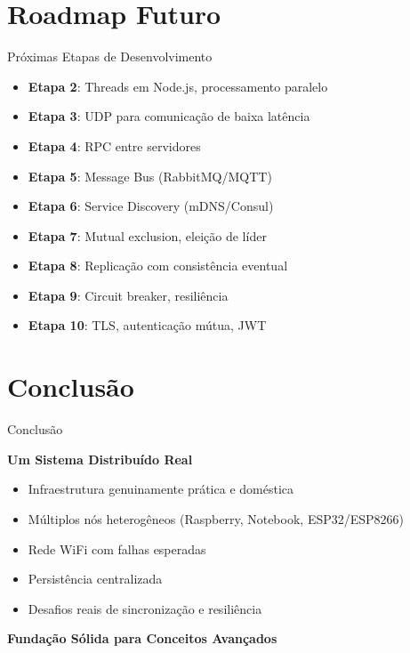 \documentclass[12pt,aspectratio=16:9]{beamer}
\begin{document}
\section{Roadmap Futuro}

\begin{frame}{Próximas Etapas de Desenvolvimento}
    \begin{itemize}[<+->]
        \item \textbf{Etapa 2}: Threads em Node.js, processamento paralelo
        \item \textbf{Etapa 3}: UDP para comunicação de baixa latência
        \item \textbf{Etapa 4}: RPC entre servidores
        \item \textbf{Etapa 5}: Message Bus (RabbitMQ/MQTT)
        \item \textbf{Etapa 6}: Service Discovery (mDNS/Consul)
        \item \textbf{Etapa 7}: Mutual exclusion, eleição de líder
        \item \textbf{Etapa 8}: Replicação com consistência eventual
        \item \textbf{Etapa 9}: Circuit breaker, resiliência
        \item \textbf{Etapa 10}: TLS, autenticação mútua, JWT
    \end{itemize}
\end{frame}

\section{Conclusão}

\begin{frame}{Conclusão}
    \begin{block}{\textbf{Um Sistema Distribuído Real}}
        \begin{itemize}
            \item Infraestrutura genuinamente prática e doméstica
            \item Múltiplos nós heterogêneos (Raspberry, Notebook, ESP32/ESP8266)
            \item Rede WiFi com falhas esperadas
            \item Persistência centralizada
            \item Desafios reais de sincronização e resiliência
        \end{itemize}
    \end{block}
    
    \vspace{1cm}
    
    \begin{center}
        \Large \textbf{Fundação Sólida para Conceitos Avançados}
    \end{center}
\end{frame}
\end{document}
